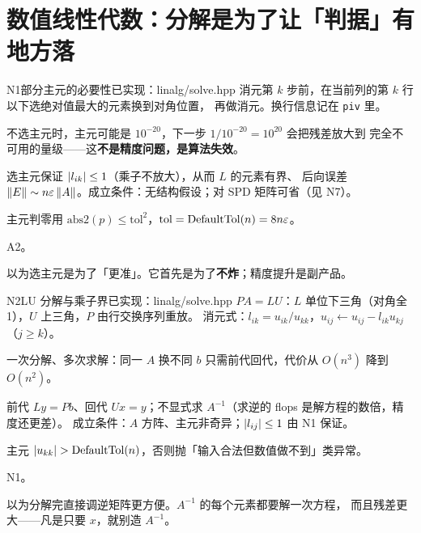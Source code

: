 \section{数值线性代数：分解是为了让「判据」有地方落}

\begin{know}{N1}{部分主元的必要性}{已实现：linalg/solve.hpp}
 消元第 $k$ 步前，在当前列的第 $k$ 行以下选绝对值最大的元素换到对角位置，
再做消元。换行信息记在 \texttt{piv} 里。

 不选主元时，主元可能是 $10^{-20}$，下一步 $1/10^{-20}=10^{20}$ 会把残差放大到
完全不可用的量级——这\textbf{不是精度问题，是算法失效}。

 选主元保证 $\left\lvert l_{ik}\right\rvert\le1$（乘子不放大），从而 $L$ 的元素有界、
后向误差 $\left\lVert E\right\rVert\sim n\varepsilon\left\lVert A\right\rVert$。成立条件：无结构假设；对 SPD 矩阵可省（见 N7）。

 主元判零用 $\mathrm{abs2}(p)\le\mathrm{tol}^{2}$，$\mathrm{tol}=\mathrm{DefaultTol}(n)=8n\varepsilon$。

 A2。

 以为选主元是为了「更准」。它首先是为了\textbf{不炸}；精度提升是副产品。
\end{know}

\begin{know}{N2}{LU 分解与乘子界}{已实现：linalg/solve.hpp}
 $PA=LU$：$L$ 单位下三角（对角全 1），$U$ 上三角，$P$ 由行交换序列重放。
消元式：$l_{ik}=u_{ik}/u_{kk}$，$u_{ij}\leftarrow u_{ij}-l_{ik}u_{kj}$（$j\ge k$）。

 一次分解、多次求解：同一 $A$ 换不同 $b$ 只需前代回代，代价从 $O(n^{3})$ 降到 $O(n^{2})$。

 前代 $Ly=Pb$、回代 $Ux=y$；不显式求 $A^{-1}$（求逆的 flops 是解方程的数倍，精度还更差）。
成立条件：$A$ 方阵、主元非奇异；$\left\lvert l_{ij}\right\rvert\le1$ 由 N1 保证。

 主元 $\left\lvert u_{kk}\right\rvert>\mathrm{DefaultTol}(n)$，否则抛「输入合法但数值做不到」类异常。

 N1。

 以为分解完直接调逆矩阵更方便。$A^{-1}$ 的每个元素都要解一次方程，
而且残差更大——凡是只要 $x$，就别造 $A^{-1}$。
\end{know}

